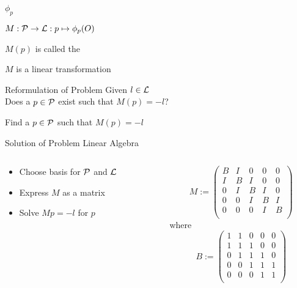 \begin{frame}{$\phi_{p}$}
	\begin{definition}
		$M : \mathcal{P} \rightarrow \mathcal{L} : p \mapsto \phi_{p}(O)$
	\end{definition}
	\bigskip
	$M(p)$ is called the 
	
	\pause
	\bigskip	
	\begin{theorem}
		$M$ is a linear transformation
	\end{theorem}
\end{frame}

\begin{frame}{Reformulation of Problem}
	Given $l \in \mathcal{L}$\\
	Does a $p \in \mathcal{P}$ exist such that $M(p) = -l$?
	
	\pause
	\bigskip
	Find a $p \in \mathcal{P}$ such that $M(p) = -l$	
\end{frame}

\begin{frame}{Solution of Problem}
	Linear Algebra
	\begin{columns}[t]
		\begin{column}{0.45\textwidth}
			\begin{itemize}
				\item Choose basis for $\mathcal{P}$ and $\mathcal{L}$
				\item Express $M$ as a matrix
				\item Solve $M p = -l$ for $p$
			\end{itemize}

		\end{column}
		\begin{column}{0.45\textwidth}
			\[
				M := \left(
				\begin{array}{ccccc}
					B & I & 0 & 0 & 0 \\
					I & B & I & 0 & 0 \\
					0 & I & B & I & 0 \\
					0 & 0 & I & B & I \\
					0 & 0 & 0 & I & B \\
				\end{array}
				\right)
			\]
			where
			\[
				B := \left(
				\begin{array}{ccccc}
					1 & 1 & 0 & 0 & 0 \\
					1 & 1 & 1 & 0 & 0 \\
					0 & 1 & 1 & 1 & 0 \\
					0 & 0 & 1 & 1 & 1 \\
					0 & 0 & 0 & 1 & 1 \\
				\end{array}
				\right)
			\]
		\end{column}
	\end{columns}
\end{frame}

